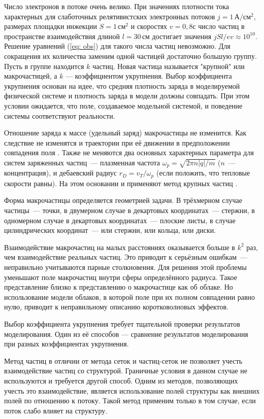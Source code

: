 \documentclass[a4paper,14pt]{extreport} %
\begin{document}
Число электронов в потоке очень велико. При значениях плотности тока характерных для слаботочных релятивистских электронных потоков \cite{Polevin} $j=1\,\text{А}/\text{см}^2$, размерах площадки инжекции $S=1\,\text{см}^2$ и скоростях $v =0{,}8с$ число частиц в пространстве взаимодействия длиной $l = 30\,\text{см}$ достигает значения $jSl/ev \approx 10^{10}$. Решение уравнений (\ref{eq: obs}) для такого числа  частиц невозможно. Для сокращения их количества заменим одной частицей достаточно большую группу. Пусть в группе находится $k$ частиц. Новая частица называется "крупной" или макрочастицей, а $k$ --- коэффициентом укрупнения. Выбор коэффициента укрупнения основан на идее, что средняя плотность заряда в моделируемой физической системе и плотность заряда в модели должны совпадать. При этом условии ожидается, что поле, создаваемое модельной системой, и поведение системы соответствуют реальности.

Отношение заряда к массе (удельный заряд) макрочастицы не изменится. Как следствие не изменятся и траектории при её движении в предположении совпадения поля \cite{Roshal}. Также не меняются два основных характерных параметра для систем заряженных частиц~--- плазменная частота $\omega_p = \sqrt{2\pi n |q|/m}$ ($n$~--- концентрация), и дебаевский радиус $r_D = v_T/\omega_p$ (если положить, что тепловые скорости равны). На этом основании и применяют метод крупных частиц \cite{Cvetkov}.

Форма макрочастицы определяется геометрией задачи. В трёхмерном случае частицы~--- точки, в двумерном случае в декартовых координатах~--- стержни, в одномерном случае в декартовых координатах~--- плоские листы, в случае цилиндрических координат~--- или стержни, или кольца, или диски.

Взаимодействие макрочастиц на малых расстояниях оказывается больше в $k^2$ раз, чем взаимодействие реальных частиц. Это приводит к серьёзным ошибкам~--- неправильно учитываются парные столкновения. Для решения этой проблемы уменьшают поле макрочастиц внутри сферы определённого радиуса. Такое представление близко к представлению о макрочастице как об облаке. Но использование модели облаков, в которой поле при их полном совпадении равно нулю, приводит к неправильному описанию коротковолновых эффектов.

Выбор коэффициента укрупнения требует тщательной проверки результатов моделирования. Один из её способов --- сравнение результатов моделирования при разных коэффициентах укрупнения. 

Метод частиц в отличии от метода сеток и частиц-сеток не позволяет учесть взаимодействие частиц со структурой. Граничные условия в данном случае не используются и требуется другой способ. Одним из методов, позволяющих учесть это взаимодействие, является использование полей структуры как внешних полей по отношению к потоку. Такой метод применим только в том случае, если поток слабо влияет на структуру.
\end{document}
